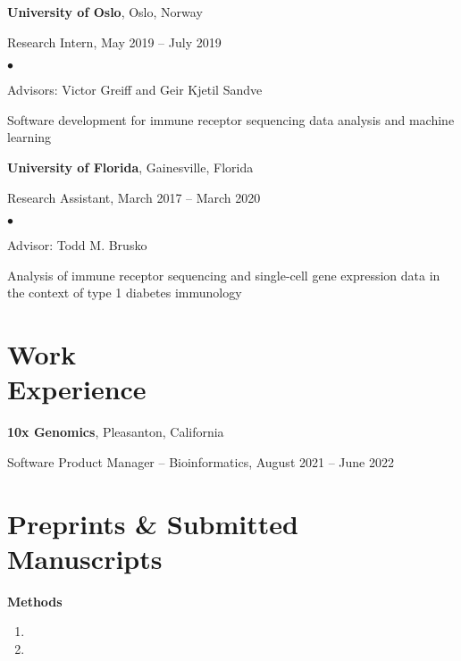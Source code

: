 \documentclass[margin,centered]{res}
\newenvironment{list1}{
  \begin{list}{\ding{113}}{%
      \setlength{\itemsep}{0in}
      \setlength{\parsep}{0in} \setlength{\parskip}{0in}
      \setlength{\topsep}{0in} \setlength{\partopsep}{0in}
      \setlength{\leftmargin}{0.17in}}}{\end{list}}
\newenvironment{list2}{
  \begin{list}{$\bullet$}{%
      \setlength{\itemsep}{0in}
      \setlength{\parsep}{0in} \setlength{\parskip}{0in}
      \setlength{\topsep}{0in} \setlength{\partopsep}{0in}
      \setlength{\leftmargin}{0.2in}}}{\end{list}}
\begin{document}
\begin{resume}
{\bf University of Oslo}, Oslo, Norway
\begin{list1}
\item[] 
Research Intern, May 2019 -- July 2019
\begin{list2}
\item Advisors: Victor Greiff and Geir Kjetil Sandve
\item Software development for immune receptor sequencing data analysis and machine learning
\end{list2} 
\end{list1}
\vspace*{-.1in}
{\bf University of Florida},  Gainesville, Florida
\begin{list1}
\item[] 
Research Assistant, March 2017 -- March 2020
\begin{list2}
\item Advisor: Todd M. Brusko
\item Analysis of immune receptor sequencing and single-cell gene expression data in the context of type 1 diabetes immunology
\end{list2} 
\end{list1}

\section{\sc Work\\ Experience}
{\bf 10x Genomics},  Pleasanton, California
\begin{list1}
\item[] 
Software Product Manager -- Bioinformatics, August 2021 -- June 2022
\end{list1}

\newpage

\section{\sc Preprints \& Submitted Manuscripts}
\textbf{Methods}
\begin{enumerate}[leftmargin=*]
\item {}
\item {}
\end{enumerate}



\end{resume}
\end{document}
